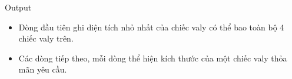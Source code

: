 Output
\begin{itemize}
	\item Dòng đầu tiên ghi diện tích nhỏ nhất của chiếc valy có thể bao toàn bộ 4 chiếc valy trên.
	\item Các dòng tiếp theo, mỗi dòng thể hiện kích thước của một chiếc valy thỏa mãn yêu cầu.
\end{itemize}
